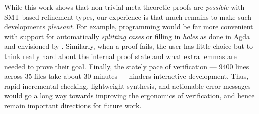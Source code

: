 %
While this work shows that non-trivial
meta-theoretic proofs are \emph{possible}
with SMT-based refinement types, our experience
is that much remains to make such developments
\emph{pleasant}.
%
For example, programming would be far more convenient
with support for automatically \emph{splitting cases}
or filling in \emph{holes} as done in Agda \cite{agda}
and envisioned by \citet{hole_driven_liquid}.
%
Similarly, when a proof fails, the user has little
choice but to think really hard about the internal
proof state and what extra lemmas are needed to prove
their goal.
%
Finally, the stately pace of verification --- 9400 lines
across 35 files take about 30 minutes --- hinders
interactive development.
%
Thus, rapid incremental checking, lightweight synthesis,
and actionable error messages would go a long way towards
improving the ergonomics of verification, and hence remain
important directions for future work.
